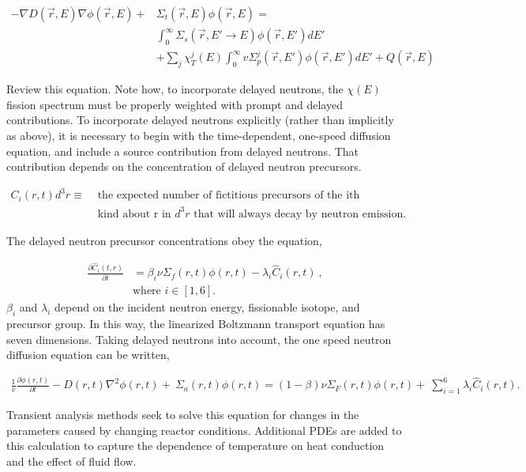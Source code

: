 \documentclass[12pt]{article}
\begin{document}
\begin{align}
-\nabla D(\vec{r},E)\nabla\phi(\vec{r},E) +& \Sigma_t(\vec{r},E)\phi(\vec{r},E) 
= \nonumber\\
&\int_0^\infty \Sigma_s(\vec{r},E'\rightarrow E)\phi(\vec{r},E')dE'\nonumber\\ 
&+ \sum_j \chi_T^j(E)\int_0^\infty v\Sigma_p^j(\vec{r},E')\phi(\vec{r},E')dE' + 
Q(\vec{r},E)
\end{align}

Review this equation. Note how, to incorporate delayed neutrons, the $\chi (E)$ 
fission spectrum must be properly weighted with prompt and delayed 
contributions. To incorporate delayed neutrons explicitly (rather than 
implicitly as above), it is necessary to begin with the time-dependent, 
one-speed diffusion equation, and include a source contribution from delayed 
neutrons. That contribution depends on the concentration of delayed neutron 
precursors.  

\begin{align}
C_i(r,t)d^3r \equiv &\mbox{ the expected number of fictitious precursors of the 
ith}\\
&\mbox{ kind about r in }d^3r\mbox{ that will always decay by neutron emission.}\nonumber
\end{align}

The delayed neutron precursor concentrations obey the equation,

\begin{align}
  \frac{\partial \hat{C}_i(t,r)}{\partial t} &=
  \beta_i\nu\Sigma_f(r,t)\phi(r,t) -
  \lambda_i\hat{C}_i(r,t)\:,\\
  &\text{where }  i\in [1,6].
  \label{delayed_precursors}
\end{align}
$\beta_i$ and $\lambda_i$ depend on the incident neutron energy, fissionable
isotope, and precursor group.  In this way, the  linearized Boltzmann transport
equation has seven dimensions.  Taking delayed neutrons into account, the one
speed neutron diffusion equation can be written,

\begin{align}
  \frac{1}{v}\frac{\partial \phi(r,t)}{\partial t} - D(r,t)\nabla^2\phi(r,t) + \
  \Sigma_a(r,t)\phi(r,t) = (1-\beta)\nu\Sigma_F(r,t)\phi(r,t) + \
  \sum_{i=1}^6\lambda_i\hat{C}_i(r,t).
  \label{boltz_one_speed}
\end{align}

Transient analysis methods seek to solve this equation for changes in the
parameters caused by changing reactor conditions. Additional PDEs are added to
this calculation to capture the dependence of temperature on heat conduction and
the effect of fluid flow.
\end{document}

